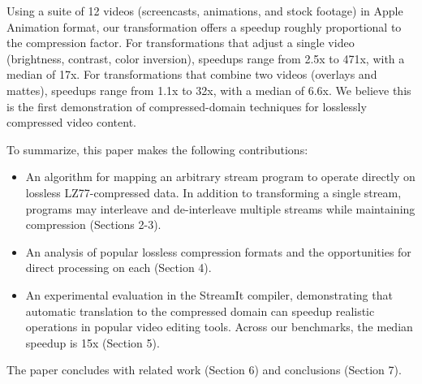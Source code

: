 Using a suite of 12 videos (screencasts, animations, and stock
footage) in Apple Animation format, our transformation offers a
speedup roughly proportional to the compression factor.  For
transformations that adjust a single video (brightness, contrast,
color inversion), speedups range from 2.5x to 471x, with a median of
17x.  For transformations that combine two videos (overlays and
mattes), speedups range from 1.1x to 32x, with a median of 6.6x.  We
believe this is the first demonstration of compressed-domain
techniques for losslessly compressed video content.



To summarize, this paper makes the following contributions:
\begin{itemize}

\item An algorithm for mapping an arbitrary stream program to operate
  directly on lossless LZ77-compressed data.  In addition to
  transforming a single stream, programs may interleave and
  de-interleave multiple streams while maintaining compression
  (Sections 2-3).

\item An analysis of popular lossless compression formats and the
  opportunities for direct processing on each (Section 4).

\item An experimental evaluation in the StreamIt compiler,
  demonstrating that automatic translation to the compressed domain
  can speedup realistic operations in popular video editing tools.
  Across our benchmarks, the median speedup is 15x (Section 5).

\end{itemize}

The paper concludes with related work (Section 6) and conclusions
(Section 7).
